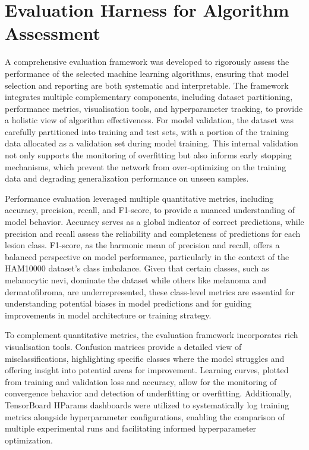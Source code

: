 \documentclass[conference]{IEEEtran}
\begin{document}
	\section{Evaluation Harness for Algorithm Assessment}
	
A comprehensive evaluation framework was developed to rigorously assess the performance of the selected machine learning algorithms, ensuring that model selection and reporting are both systematic and interpretable. The framework integrates multiple complementary components, including dataset partitioning, performance metrics, visualisation tools, and hyperparameter tracking, to provide a holistic view of algorithm effectiveness. For model validation, the dataset was carefully partitioned into training and test sets, with a portion of the training data allocated as a validation set during model training. This internal validation not only supports the monitoring of overfitting but also informs early stopping mechanisms, which prevent the network from over-optimizing on the training data and degrading generalization performance on unseen samples.

Performance evaluation leveraged multiple quantitative metrics, including accuracy, precision, recall, and F1-score, to provide a nuanced understanding of model behavior. Accuracy serves as a global indicator of correct predictions, while precision and recall assess the reliability and completeness of predictions for each lesion class. F1-score, as the harmonic mean of precision and recall, offers a balanced perspective on model performance, particularly in the context of the HAM10000 dataset’s class imbalance. Given that certain classes, such as melanocytic nevi, dominate the dataset while others like melanoma and dermatofibroma, are underrepresented, these class-level metrics are essential for understanding potential biases in model predictions and for guiding improvements in model architecture or training strategy.

To complement quantitative metrics, the evaluation framework incorporates rich visualisation tools. Confusion matrices provide a detailed view of misclassifications, highlighting specific classes where the model struggles and offering insight into potential areas for improvement. Learning curves, plotted from training and validation loss and accuracy, allow for the monitoring of convergence behavior and detection of underfitting or overfitting. Additionally, TensorBoard HParams dashboards were utilized to systematically log training metrics alongside hyperparameter configurations, enabling the comparison of multiple experimental runs and facilitating informed hyperparameter optimization.
\end{document}

